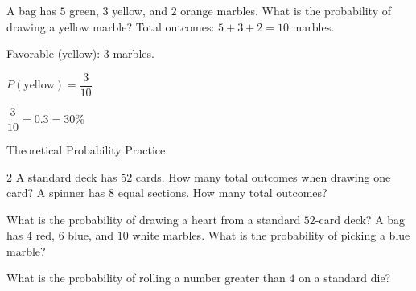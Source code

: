 \begin{stepExample}{A bag has $5$ green, $3$ yellow, and $2$ orange marbles. What is the probability of drawing a yellow marble?}
     Total outcomes: $5 + 3 + 2 = 10$ marbles.

     Favorable (yellow): $3$ marbles.

     $P(\text{yellow}) = \dfrac{3}{10}$

     $\dfrac{3}{10} = 0.3 = 30\%$
\end{stepExample}


\newpage
\begin{stepPractice}{Theoretical Probability Practice}
    \resetProblems

    \begin{multicols}{2}
    \prob A standard deck has $52$ cards. How many total outcomes when drawing one card? \answerBlank[2cm]
    \prob A spinner has $8$ equal sections. How many total outcomes? \answerBlank[2cm]
    \end{multicols}

    \prob What is the probability of drawing a heart from a standard $52$-card deck? \answerBlank[2cm]
    \prob A bag has $4$ red, $6$ blue, and $10$ white marbles. What is the probability of picking a blue marble? \answerBlank[2cm]

    \prob What is the probability of rolling a number greater than $4$ on a standard die? \answerBlank[2cm]

\end{stepPractice}
